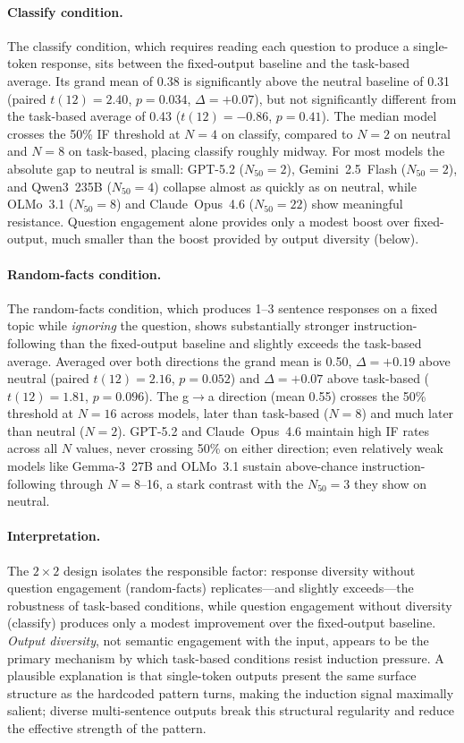 \paragraph{Classify condition.}
The classify condition, which requires reading each question to produce a single-token response, sits between the fixed-output baseline and the task-based average. Its grand mean of 0.38 is significantly above the neutral baseline of 0.31 (paired $t(12){=}2.40$, $p{=}0.034$, $\Delta{=}{+}0.07$), but not significantly different from the task-based average of 0.43 ($t(12){=}{-}0.86$, $p{=}0.41$). The median model crosses the 50\% IF threshold at $N{=}4$ on classify, compared to $N{=}2$ on neutral and $N{=}8$ on task-based, placing classify roughly midway. For most models the absolute gap to neutral is small: GPT-5.2 ($N_{50}{=}2$), Gemini~2.5~Flash ($N_{50}{=}2$), and Qwen3~235B ($N_{50}{=}4$) collapse almost as quickly as on neutral, while OLMo~3.1 ($N_{50}{=}8$) and Claude~Opus~4.6 ($N_{50}{=}22$) show meaningful resistance. Question engagement alone provides only a modest boost over fixed-output, much smaller than the boost provided by output diversity (below).

\paragraph{Random-facts condition.}
The random-facts condition, which produces 1--3 sentence responses on a fixed topic while \emph{ignoring} the question, shows substantially stronger instruction-following than the fixed-output baseline and slightly exceeds the task-based average. Averaged over both directions the grand mean is 0.50, $\Delta{=}{+}0.19$ above neutral (paired $t(12){=}2.16$, $p{=}0.052$) and $\Delta{=}{+}0.07$ above task-based ($t(12){=}1.81$, $p{=}0.096$). The g$\to$a direction (mean 0.55) crosses the 50\% threshold at $N{=}16$ across models, later than task-based ($N{=}8$) and much later than neutral ($N{=}2$). GPT-5.2 and Claude~Opus~4.6 maintain high IF rates across all $N$ values, never crossing 50\% on either direction; even relatively weak models like Gemma-3~27B and OLMo~3.1 sustain above-chance instruction-following through $N{=}8$--16, a stark contrast with the $N_{50}{=}3$ they show on neutral.

\paragraph{Interpretation.}
The $2{\times}2$ design isolates the responsible factor: response diversity without question engagement (random-facts) replicates---and slightly exceeds---the robustness of task-based conditions, while question engagement without diversity (classify) produces only a modest improvement over the fixed-output baseline. \emph{Output diversity}, not semantic engagement with the input, appears to be the primary mechanism by which task-based conditions resist induction pressure. A plausible explanation is that single-token outputs present the same surface structure as the hardcoded pattern turns, making the induction signal maximally salient; diverse multi-sentence outputs break this structural regularity and reduce the effective strength of the pattern.

